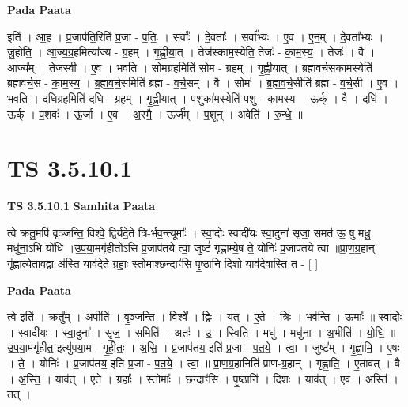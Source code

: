 \documentclass[17pt]{extarticle}
\begin{document}
\textbf{Pada Paata} \newline

इति॑ । आ॒ह॒ । प्र॒जाप॑ति॒रिति॑ प्र॒जा - प॒तिः॒ । सर्वाः᳚ । दे॒वताः᳚ । सर्वा᳚भ्यः । ए॒व । ए॒न॒म् । दे॒वता᳚भ्यः । जु॒हो॒ति॒ । आ॒ज्य॒ग्र॒हमित्या᳚ज्य - ग्र॒हम् । गृ॒ह्णी॒या॒त् । तेज॑स्काम॒स्येति॒ तेजः॑ - का॒म॒स्य॒ । तेजः॑ । वै । आज्य᳚म् । ते॒ज॒स्वी । ए॒व । भ॒व॒ति॒ । सो॒म॒ग्र॒हमिति॑ सोम - ग्र॒हम् । गृ॒ह्णी॒या॒त् । ब्र॒ह्म॒व॒र्च॒सका॑म॒स्येति॑ ब्रह्मवर्च॒स - का॒म॒स्य॒ । ब्र॒ह्म॒व॒र्च॒समिति॑ ब्रह्म - व॒र्च॒सम् । वै । सोमः॑ । ब्र॒ह्म॒व॒र्च॒सीति॑ ब्रह्म - व॒र्च॒सी । ए॒व । भ॒व॒ति॒ । द॒धि॒ग्र॒हमिति॑ दधि - ग्र॒हम् । गृ॒ह्णी॒या॒त् । प॒शुका॑म॒स्येति॑ प॒शु - का॒म॒स्य॒ । ऊर्क् । वै । दधि॑ । ऊर्क् । प॒शवः॑ । ऊ॒र्जा । ए॒व । अ॒स्मै॒ । ऊर्ज᳚म् । प॒शून् । अवेति॑ । रु॒न्धे॒ ॥  \newline




\section*{ TS 3.5.10.1 }

\textbf{TS 3.5.10.1 } \newline
\textbf{Samhita Paata} \newline

त्वे क्रतु॒मपि॑ वृञ्जन्ति॒ विश्वे॒ द्विर्यदे॒ते त्रि-र्भव॒न्त्यूमाः᳚ । स्वा॒दोः स्वादी॑यः स्वा॒दुना॑ सृजा॒ समत॑ ऊ॒ षु मधु॒ मधु॑ना॒ऽभि यो॑धि ।उ॒प॒या॒मगृ॑हीतोऽसि प्र॒जाप॑तये त्वा॒ जुष्टं॑ गृह्णाम्ये॒ष ते॒ योनिः॑ प्र॒जाप॑तये त्वा ॥प्रा॒ण॒ग्र॒हान् गृ॑ह्णात्ये॒ताव॒द्वा अ॑स्ति॒ याव॑दे॒ते ग्रहाः॒ स्तोमा॒श्छन्दाꣳ॑सि पृ॒ष्ठानि॒ दिशो॒ याव॑दे॒वास्ति॒ त - [  ] \newline

\textbf{Pada Paata} \newline

त्वे इति॑ । क्रतु᳚म् । अपीति॑ । वृ॒ञ्ज॒न्ति॒ । विश्वे᳚ । द्विः । यत् । ए॒ते । त्रिः । भव॑न्ति । ऊमाः᳚ ॥ स्वा॒दोः । स्वादी॑यः । स्वा॒दुना᳚ । सृ॒ज॒ । समिति॑ । अतः॑ । उ॒ । स्विति॑ । मधु॑ । मधु॑ना । अ॒भीति॑ । यो॒धि॒ ॥ उ॒प॒या॒मगृ॑हीत॒ इत्यु॑पया॒म - गृ॒ही॒तः॒ । अ॒सि॒ । प्र॒जाप॑तय॒ इति॑ प्र॒जा - प॒त॒ये॒ । त्वा॒ । जुष्ट᳚म् । गृ॒ह्णा॒मि॒ । ए॒षः । ते॒ । योनिः॑ । प्र॒जाप॑तय॒ इति॑ प्र॒जा - प॒त॒ये॒ । त्वा॒ ॥ प्रा॒ण॒ग्र॒हानिति॑ प्राण-ग्र॒हान् । गृ॒ह्णा॒ति॒ । ए॒ताव॑त् । वै । अ॒स्ति॒ । याव॑त् । ए॒ते । ग्रहाः᳚ । स्तोमाः᳚ । छन्दाꣳ॑सि । पृ॒ष्ठानि॑ । दिशः॑ । याव॑त् । ए॒व । अस्ति॑ । तत् ।  \newline
\end{document}
